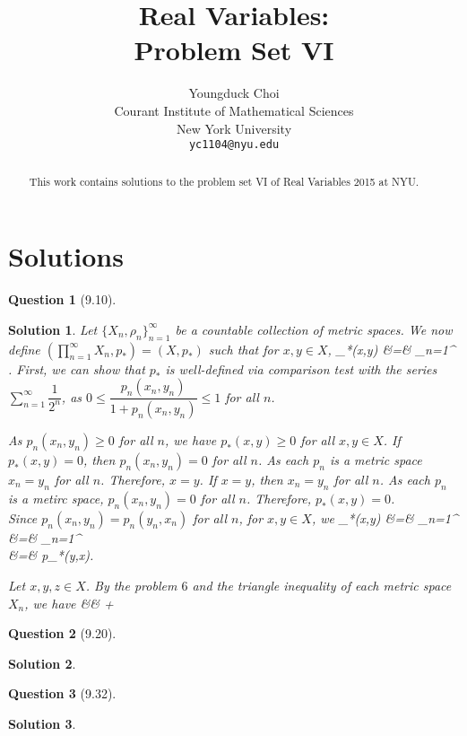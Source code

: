 \documentclass{article} %
\title{Real Variables: \\
Problem Set VI}
\author{
Youngduck Choi \\
Courant Institute of Mathematical Sciences \\
New York University \\
\texttt{yc1104@nyu.edu} \\
}
\def\eQb#1\eQe{\begin{eqnarray*}#1\end{eqnarray*}}
\theoremstyle{quest}
\newtheorem*{question}{Question}
\newtheorem*{solution}{Solution}
\begin{document}
\maketitle

\begin{abstract}
This work contains solutions to the problem set 
VI of Real Variables 2015 at NYU.
\end{abstract}

\section{Solutions}

\begin{question}[9.10]
\end{question}
\begin{solution}
Let $\{X_n, \rho_n \}_{n=1}^{\infty}$ be a countable collection
of metric spaces. We now define 
$( \prod_{n=1}^{\infty} X_n , p_*) = (X,p_*)$ such that for $x,y \in 
X$,
\eQb
p_*(x,y) &=& \sum_{n=1}^{\infty}  \cdot
{}. 
\eQe
First, we can show that $p_*$ is well-defined via
comparison test with the series $\sum_{n=1}^{\infty} \dfrac{1}{2^n}$,
as $0 \leq \dfrac{p_n(x_n,y_n)}{1+p_n(x_n,y_n)} \leq 1$ for all $n$. \\

\smallskip

As $p_n(x_n,y_n) \geq 0$ for all $n$, we have $p_*(x,y) \geq 0$ for all 
$x,y \in X$. If $p_*(x,y) = 0$, then $p_n(x_n,y_n) = 0$ for all $n$. 
As each $p_n$ is a metric space $x_n = y_n$ for all $n$. Therefore, 
$x = y$. If $x = y$, then $x_n = y_n$ for all $n$. As each $p_n$
is a metirc space, $p_n(x_n,
y_n) = 0$ for all $n$. Therefore, $p_*(x,y) = 0$. \\

\smallskip
Since $p_n(x_n,y_n) = p_n(y_n,x_n)$ for all $n$, for $x,y \in X$, we
\eQb
p_*(x,y) &=& \sum_{n=1}^{\infty}  \cdot
{} \\
&=& \sum_{n=1}^{\infty}  \cdot
{} \\
&=& p_*(y,x).
\eQe

Let $x,y,z \in X$. By the problem $6$ and the triangle inequality
of each metric space $X_n$,  we have
\eQb
\dfrac{p_n(x_n,z_n)}{1 + p_n(x_n,z_n)} &\leq& 
 + 
 \\ 
\eQe 

\end{solution}

\bigskip

\begin{question}[9.20]
\end{question}
\begin{solution}
\end{solution}

\bigskip

\begin{question}[9.32]
\end{question}
\begin{solution}
\end{solution}

\bigskip
\end{document}
